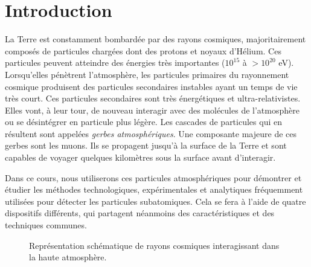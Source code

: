 \section{Introduction}
\setcounter{page}{1}

La Terre est constamment bombardée par des rayons cosmiques, majoritairement composés de particules chargées dont des protons et noyaux d'Hélium. Ces particules peuvent atteindre des énergies très importantes ($10^{15}$ à $>10^{20}$ eV). Lorsqu'elles pénètrent l'atmosphère, les particules primaires du rayonnement cosmique produisent des particules secondaires instables ayant un temps de vie très court. Ces particules secondaires sont très énergétiques et ultra-relativistes. Elles vont, à leur tour, de nouveau interagir avec des molécules de l'atmosphère ou se désintégrer en particule plus légère. Les cascades de particules qui en résultent sont appelées \textit{gerbes atmosphériques}. Une composante majeure de ces gerbes sont les muons. Ils se propagent jusqu'à la surface de la Terre et sont capables de voyager quelques kilomètres sous la surface avant d'interagir.

Dans ce cours, nous utiliserons ces particules atmosphériques pour démontrer et étudier les méthodes technologiques, expérimentales et analytiques fréquemment utilisées pour détecter les particules subatomiques. Cela se fera à l'aide de quatre dispositifs différents, qui partagent néanmoins des caractéristiques et des techniques communes.

\begin{figure}[hb]
    \caption{\label{fig:CR} Représentation schématique de rayons cosmiques interagissant dans la haute atmosphère.}
\end{figure}

